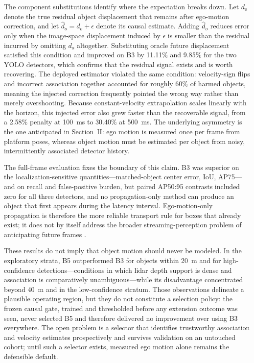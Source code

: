 \documentclass[journal]{IEEEtran}
\begin{document}
The component substitutions identify where the expectation breaks down. Let $d_o$ denote the true residual object displacement that remains after ego-motion correction, and let $\widehat{d}_o=d_o+\epsilon$ denote its causal estimate. Adding $\widehat{d}_o$ reduces error only when the image-space displacement induced by $\epsilon$ is smaller than the residual incurred by omitting $d_o$ altogether. Substituting oracle future displacement satisfied this condition and improved on B3 by 11.11\% and 9.85\% for the two YOLO detectors, which confirms that the residual signal exists and is worth recovering. The deployed estimator violated the same condition: velocity-sign flips and incorrect association together accounted for roughly 60\% of harmed objects, meaning the injected correction frequently pointed the wrong way rather than merely overshooting. Because constant-velocity extrapolation scales linearly with the horizon, this injected error also grew faster than the recoverable signal, from a 2.58\% penalty at 100~ms to 30.40\% at 500~ms. The underlying asymmetry is the one anticipated in Section~II: ego motion is measured once per frame from platform poses, whereas object motion must be estimated per object from noisy, intermittently associated detector history.

The full-frame evaluation fixes the boundary of this claim. B3 was superior on the localization-sensitive quantities---matched-object center error, IoU, AP75---and on recall and false-positive burden, but paired AP50:95 contrasts included zero for all three detectors, and no propagation-only method can produce an object that first appears during the latency interval. Ego-motion-only propagation is therefore the more reliable transport rule for boxes that already exist; it does not by itself address the broader streaming-perception problem of anticipating future frames \cite{Li2020Streaming,Yang2022Streaming,Wang2023ASAP}.

These results do not imply that object motion should never be modeled. In the exploratory strata, B5 outperformed B3 for objects within 20~m and for high-confidence detections---conditions in which lidar depth support is dense and association is comparatively unambiguous---while its disadvantage concentrated beyond 40~m and in the low-confidence stratum. Those observations delineate a plausible operating region, but they do not constitute a selection policy: the frozen causal gate, trained and thresholded before any extension outcome was seen, never selected B5 and therefore delivered no improvement over using B3 everywhere. The open problem is a selector that identifies trustworthy association and velocity estimates prospectively and survives validation on an untouched cohort; until such a selector exists, measured ego motion alone remains the defensible default.
\end{document}
